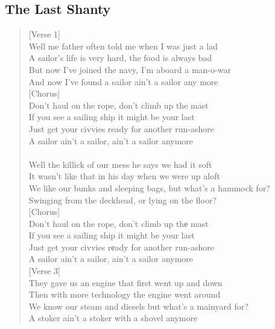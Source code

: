 \documentclass[11pt]{article}
\begin{document}
\subsection{The Last Shanty}
\label{sec:orgb26ac1f}
\begin{verse}
[Verse 1]\\
Well me father often told me when I was just a lad\\
A sailor's life is very hard, the food is always bad\\
But now I've joined the navy, I'm aboard a man-o-war\\
And now I've found a sailor ain't a sailor any more\\
\vspace*{1em}
[Chorus]\\
Don't haul on the rope, don't climb up the mast\\
If you see a sailing ship it might be your last\\
Just get your civvies ready for another run-ashore\\
A sailor ain't a sailor, ain't a sailor anymore\\
[Verse 2]\\
Well the killick of our mess he says we had it soft\\
It wasn't like that in his day when we were up aloft\\
We like our bunks and sleeping bags, but what's a hammock for?\\
Swinging from the deckhead, or lying on the floor?\\
\vspace*{1em}
[Chorus]\\
Don't haul on the rope, don't climb up thе mast\\
If you see a sailing ship it might be your last\\
Just get your civvies rеady for another run-ashore\\
A sailor ain't a sailor, ain't a sailor anymore\\
\vspace*{1em}
[Verse 3]\\
They gave us an engine that first went up and down\\
Then with more technology the engine went around\\
We know our steam and diesels but what's a mainyard for?\\
A stoker ain't a stoker with a shovel anymore\\
\vspace*{1em}

\end{verse}
\end{document}
